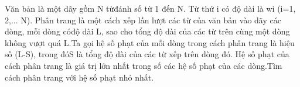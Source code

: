 Văn bản là một dãy gồm N từđánh số từ 1 đến N. Từ thứ i có độ dài là wi (i=1, 2,... N). Phân trang là một cách xếp lần lượt các từ của văn bản vào dãy các dòng, mỗi dòng cóđộ dài L, sao cho tổng độ dài của các từ trên cùng một dòng không vượt quá L.Ta gọi hệ số phạt của mỗi dòng trong cách phân trang là hiệu số (L-S), trong đóS là tổng độ dài của các từ xếp trên dòng đó. Hệ số phạt của cách phân trang là giá trị lớn nhất trong số các hệ số phạt của các dòng.Tìm cách phân trang với hệ số phạt nhỏ nhất.